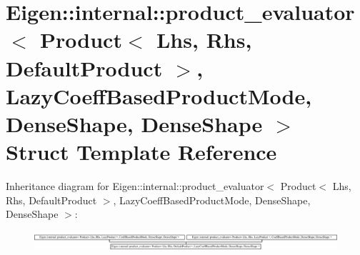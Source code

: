 \hypertarget{struct_eigen_1_1internal_1_1product__evaluator_3_01_product_3_01_lhs_00_01_rhs_00_01_default_pro06ca9210bc576c533682d6dfc3cec111}{}\section{Eigen\+:\+:internal\+:\+:product\+\_\+evaluator$<$ Product$<$ Lhs, Rhs, Default\+Product $>$, Lazy\+Coeff\+Based\+Product\+Mode, Dense\+Shape, Dense\+Shape $>$ Struct Template Reference}
\label{struct_eigen_1_1internal_1_1product__evaluator_3_01_product_3_01_lhs_00_01_rhs_00_01_default_pro06ca9210bc576c533682d6dfc3cec111}
Inheritance diagram for Eigen\+:\+:internal\+:\+:product\+\_\+evaluator$<$ Product$<$ Lhs, Rhs, Default\+Product $>$, Lazy\+Coeff\+Based\+Product\+Mode, Dense\+Shape, Dense\+Shape $>$\+:\begin{figure}[H]
\begin{center}
\leavevmode
\includegraphics[height=0.714286cm]{struct_eigen_1_1internal_1_1product__evaluator_3_01_product_3_01_lhs_00_01_rhs_00_01_default_pro06ca9210bc576c533682d6dfc3cec111}
\end{center}
\end{figure}
